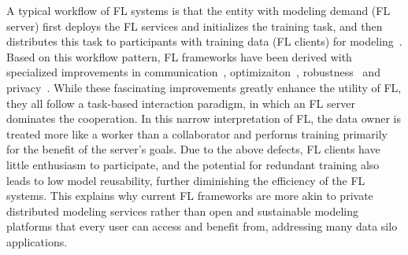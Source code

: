A typical workflow of FL systems is that the entity with modeling demand (FL server) first deploys the FL services and initializes the training task, and then distributes this task to participants with training data (FL clients) for modeling~\cite{bonawitz2019towards}.
Based on this workflow pattern, FL frameworks have been derived with specialized improvements in communication~\cite{konevcny2016federated, mcmahan2017communication, xu2023asynchronous}, optimizaiton~\cite{li2018federated, karimireddy2020scaffold, li2021model}, robustness~\cite{duan2020self, sattler2019robust, li2022federated} and privacy~\cite{bonawitz2017practical, geyer2017differentially, cheng2021secureboost}.
While these fascinating improvements greatly enhance the utility of FL, they all follow a task-based interaction paradigm, in which an FL server dominates the cooperation.
In this narrow interpretation of FL, the data owner is treated more like a worker than a collaborator and performs training primarily for the benefit of the server's goals.
Due to the above defects, FL clients have little enthusiasm to participate, and the potential for redundant training also leads to low model reusability, further diminishing the efficiency of the FL systems.
This explains why current FL frameworks are more akin to private distributed modeling services rather than open and sustainable modeling platforms that every user can access and benefit from, addressing many data silo applications.

